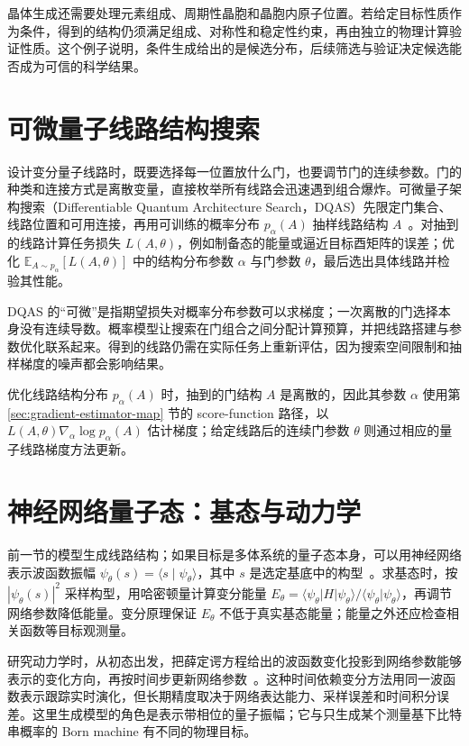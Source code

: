 晶体生成还需要处理元素组成、周期性晶胞和晶胞内原子位置。若给定目标性质作为条件，得到的结构仍须满足组成、对称性和稳定性约束，再由独立的物理计算验证性质。这个例子说明，条件生成给出的是候选分布，后续筛选与验证决定候选能否成为可信的科学结果。

\section{可微量子线路结构搜索}

设计变分量子线路时，既要选择每一位置放什么门，也要调节门的连续参数。门的种类和连接方式是离散变量，直接枚举所有线路会迅速遇到组合爆炸。可微量子架构搜索（Differentiable Quantum Architecture Search，DQAS）先限定门集合、线路位置和可用连接，再用可训练的概率分布 \(p_\alpha(A)\) 抽样线路结构 \(A\)~\cite{zhang2022dqas}。对抽到的线路计算任务损失 \(L(A,\theta)\)，例如制备态的能量或逼近目标酉矩阵的误差；优化 \(\mathbb E_{A\sim p_\alpha}[L(A,\theta)]\) 中的结构分布参数 \(\alpha\) 与门参数 \(\theta\)，最后选出具体线路并检验其性能。

DQAS 的“可微”是指期望损失对概率分布参数可以求梯度；一次离散的门选择本身没有连续导数。概率模型让搜索在门组合之间分配计算预算，并把线路搭建与参数优化联系起来。得到的线路仍需在实际任务上重新评估，因为搜索空间限制和抽样梯度的噪声都会影响结果。

优化线路结构分布 \(p_\alpha(A)\) 时，抽到的门结构 \(A\) 是离散的，因此其参数 \(\alpha\) 使用第 \ref{sec:gradient-estimator-map} 节的 score-function 路径，以 \(L(A,\theta)\nabla_\alpha\log p_\alpha(A)\) 估计梯度；给定线路后的连续门参数 \(\theta\) 则通过相应的量子线路梯度方法更新。

\section{神经网络量子态：基态与动力学}

前一节的模型生成线路结构；如果目标是多体系统的量子态本身，可以用神经网络表示波函数振幅 \(\psi_\theta(s)=\langle s\mid\psi_\theta\rangle\)，其中 \(s\) 是选定基底中的构型~\cite{carleo2017nqs}。求基态时，按 \(|\psi_\theta(s)|^2\) 采样构型，用哈密顿量计算变分能量 \(E_\theta=\langle\psi_\theta|H|\psi_\theta\rangle/\langle\psi_\theta|\psi_\theta\rangle\)，再调节网络参数降低能量。变分原理保证 \(E_\theta\) 不低于真实基态能量；能量之外还应检查相关函数等目标观测量。

研究动力学时，从初态出发，把薛定谔方程给出的波函数变化投影到网络参数能够表示的变化方向，再按时间步更新网络参数~\cite{carleo2017nqs}。这种时间依赖变分方法用同一波函数表示跟踪实时演化，但长期精度取决于网络表达能力、采样误差和时间积分误差。这里生成模型的角色是表示带相位的量子振幅；它与只生成某个测量基下比特串概率的 Born machine 有不同的物理目标。

